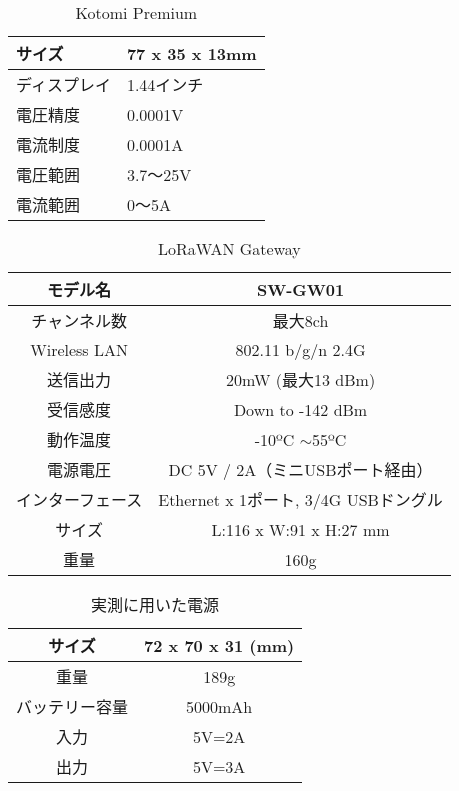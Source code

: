 \begin{table}[]
    \caption{Kotomi Premium}\label{fig:Kotomi_Spec}
    \centering
    \begin{tabular}{|l|l|}
    \hline
    サイズ    & 77 x 35 x 13mm \\ \hline
    ディスプレイ & 1.44インチ        \\ \hline
    電圧精度   & 0.0001V        \\ \hline
    電流制度   & 0.0001A        \\ \hline
    電圧範囲   & 3.7～25V        \\ \hline
    電流範囲   & 0～5A           \\ \hline
    \end{tabular}
\end{table}

\begin{table}[]
    \caption{LoRaWAN Gateway}\label{fig:LoRaWAN_Gateway_Spec}
    \centering
    \begin{tabular}{|c|c|}
    \hline
    モデル名         & SW-GW01                       \\ \hline
    チャンネル数       & 最大8ch                         \\ \hline
    Wireless LAN & 802.11 b/g/n 2.4G             \\ \hline
    送信出力         & 20mW (最大13 dBm)               \\ \hline
    受信感度         & Down to -142 dBm              \\ \hline
    動作温度         & -10ºC $\sim$55ºC              \\ \hline
    電源電圧         & DC 5V / 2A（ミニUSBポート経由）        \\ \hline
    インターフェース     & Ethernet x 1ポート, 3/4G USBドングル \\ \hline
    サイズ          & L:116 x W:91 x H:27 mm        \\ \hline
    重量           & 160g                          \\ \hline
    \end{tabular}
\end{table}

\begin{table}[]
    \caption{実測に用いた電源}\label{fig:LoRaWAN_Battery}
    \centering
    \begin{tabular}{|c|c|}
    \hline
    サイズ     & 72 x 70 x 31 (mm) \\ \hline
    重量      & 189g              \\ \hline
    バッテリー容量 & 5000mAh           \\ \hline
    入力      & 5V=2A             \\ \hline
    出力      & 5V=3A             \\ \hline
    \end{tabular}
\end{table}